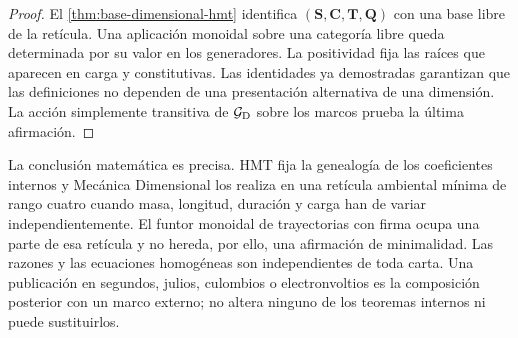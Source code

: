 \begin{proof}
El \cref{thm:base-dimensional-hmt} identifica
\((\mathbf S,\mathbf C,\mathbf T,\mathbf Q)\) con una base libre de la
retícula. Una aplicación monoidal sobre una categoría libre queda determinada
por su valor en los generadores. La positividad fija las raíces que aparecen
en carga y constitutivas. Las identidades ya demostradas garantizan que las
definiciones no dependen de una presentación alternativa de una dimensión.
La acción simplemente transitiva de \(\mathcal G_{\rm D}\) sobre los marcos
prueba la última afirmación.
\end{proof}

La conclusión matemática es precisa. HMT fija la genealogía de los
coeficientes internos y Mecánica Dimensional los realiza en una retícula
ambiental mínima de rango cuatro cuando masa, longitud, duración y carga han
de variar independientemente. El funtor monoidal de trayectorias con firma
ocupa una parte de esa retícula y no hereda, por ello, una afirmación de
minimalidad. Las razones y las ecuaciones homogéneas son independientes de
toda carta. Una publicación en segundos, julios, culombios o
electronvoltios es la composición posterior con un marco externo; no altera
ninguno de los teoremas internos ni puede sustituirlos.
